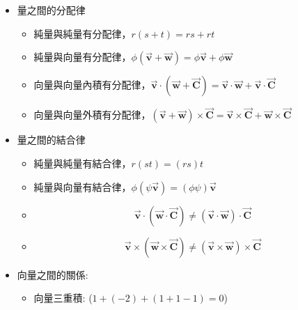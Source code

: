 \documentclass[../main.tex]{subfiles}
\begin{document}
\begin{itemize}
\begin{itemize}
    \item 向量與向量內積，可交換，$\vec {\bm v} \cdot \vec {\bm w} = \vec {\bm w} \cdot \vec {\bm v}$
    \item {}，會差一個方向的負號
      \begin{equation}
        \boxed{\vec {\bm v} \times \vec {\bm w} = -(\vec {\bm w} \times \vec {\bm v})}
      \end{equation}
  \end{itemize}
  \item 量之間的分配律
  \begin{itemize}
    \item 純量與純量有分配律，$r(s+t) = rs + rt$
    \item 純量與向量有分配律，$\phi(\vec {\bm v} + \vec {\bm w}) = \phi \vec {\bm v} + \phi \vec {\bm w}$
    \item 向量與向量內積有分配律，$\vec {\bm v} \cdot (\vec {\bm w} + \vec {\bm C}) = \vec {\bm v} \cdot \vec {\bm w} + \vec {\bm v} \cdot \vec {\bm C}$
    \item 向量與向量外積有分配律，$(\vec {\bm v} + \vec {\bm w}) \times \vec {\bm C} = \vec {\bm v} \times \vec {\bm C} + \vec {\bm w} \times \vec {\bm C}$
  \end{itemize}
  \item 量之間的結合律
  \begin{itemize}
    \item 純量與純量有結合律，$r(st) = (rs)t$
    \item 純量與向量有結合律，$\phi(\psi \vec {\bm v}) = (\phi \psi)\vec {\bm v}$
    \item {}
      \begin{equation}
        \boxed{\vec {\bm v} \cdot (\vec {\bm w} \cdot \vec {\bm C}) \neq (\vec {\bm v} \cdot \vec {\bm w}) \cdot \vec {\bm C}}
      \end{equation}
    \item {}
      \begin{equation}
        \boxed{\vec {\bm v} \times (\vec {\bm w} \times \vec {\bm C}) \neq (\vec {\bm v} \times \vec {\bm w}) \times \vec {\bm C}}
      \end{equation}
  \end{itemize}
  \item 向量之間的關係:
  \begin{itemize}
    \item 向量三重積: ($1 + (-2) + (1 + 1 - 1) = 0$)\\

\end{itemize}
\end{itemize}
\end{document}
